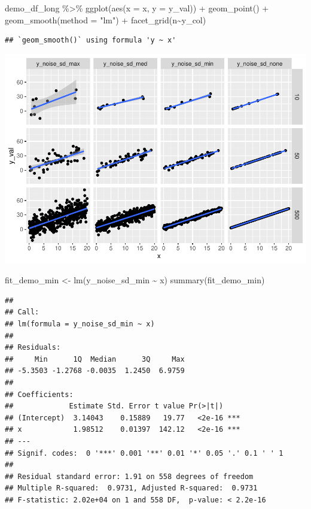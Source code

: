 \documentclass[
]{book}
\newenvironment{Shaded}{\begin{snugshade}}{\end{snugshade}}
\newcommand{\AttributeTok}[1]{\textcolor[rgb]{0.77,0.63,0.00}{#1}}
\newcommand{\FunctionTok}[1]{\textcolor[rgb]{0.00,0.00,0.00}{#1}}
\newcommand{\NormalTok}[1]{#1}
\newcommand{\OtherTok}[1]{\textcolor[rgb]{0.56,0.35,0.01}{#1}}
\newcommand{\SpecialCharTok}[1]{\textcolor[rgb]{0.00,0.00,0.00}{#1}}
\newcommand{\StringTok}[1]{\textcolor[rgb]{0.31,0.60,0.02}{#1}}
\begin{document}
\begin{Shaded}
\begin{Highlighting}[]
\NormalTok{demo\_df\_long }\SpecialCharTok{\%\textgreater{}\%} 
  \FunctionTok{ggplot}\NormalTok{(}\FunctionTok{aes}\NormalTok{(}\AttributeTok{x =}\NormalTok{ x, }\AttributeTok{y =}\NormalTok{ y\_val)) }\SpecialCharTok{+}
  \FunctionTok{geom\_point}\NormalTok{() }\SpecialCharTok{+}
  \FunctionTok{geom\_smooth}\NormalTok{(}\AttributeTok{method =} \StringTok{"lm"}\NormalTok{) }\SpecialCharTok{+} 
  \FunctionTok{facet\_grid}\NormalTok{(n}\SpecialCharTok{\textasciitilde{}}\NormalTok{y\_col)}
\end{Highlighting}
\end{Shaded}

\begin{verbatim}
## `geom_smooth()` using formula 'y ~ x'
\end{verbatim}

\includegraphics{test_course_notes_files/figure-latex/unnamed-chunk-85-1.pdf}

\begin{Shaded}
\begin{Highlighting}[]
\NormalTok{fit\_demo\_min }\OtherTok{\textless{}{-}} \FunctionTok{lm}\NormalTok{(y\_noise\_sd\_min }\SpecialCharTok{\textasciitilde{}}\NormalTok{ x)}
\FunctionTok{summary}\NormalTok{(fit\_demo\_min)}
\end{Highlighting}
\end{Shaded}

\begin{verbatim}
## 
## Call:
## lm(formula = y_noise_sd_min ~ x)
## 
## Residuals:
##     Min      1Q  Median      3Q     Max 
## -5.3503 -1.2768 -0.0035  1.2450  6.9759 
## 
## Coefficients:
##             Estimate Std. Error t value Pr(>|t|)    
## (Intercept)  3.14043    0.15889   19.77   <2e-16 ***
## x            1.98512    0.01397  142.12   <2e-16 ***
## ---
## Signif. codes:  0 '***' 0.001 '**' 0.01 '*' 0.05 '.' 0.1 ' ' 1
## 
## Residual standard error: 1.91 on 558 degrees of freedom
## Multiple R-squared:  0.9731, Adjusted R-squared:  0.9731 
## F-statistic: 2.02e+04 on 1 and 558 DF,  p-value: < 2.2e-16
\end{verbatim}
\end{document}
